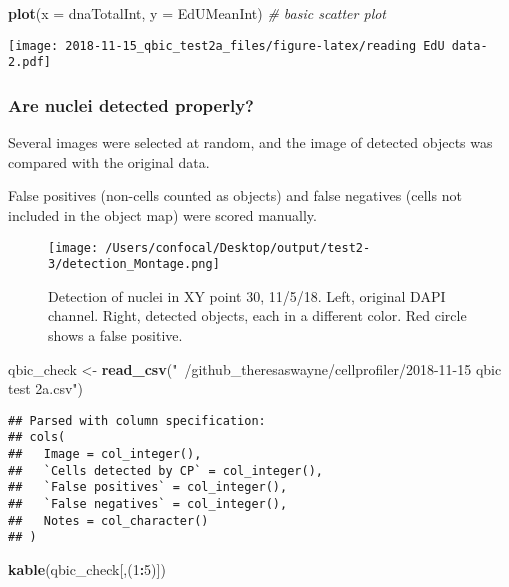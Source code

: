 \documentclass[]{article}
\newenvironment{Shaded}{\begin{snugshade}}{\end{snugshade}}
\newcommand{\KeywordTok}[1]{\textcolor[rgb]{0.13,0.29,0.53}{\textbf{#1}}}
\newcommand{\DataTypeTok}[1]{\textcolor[rgb]{0.13,0.29,0.53}{#1}}
\newcommand{\DecValTok}[1]{\textcolor[rgb]{0.00,0.00,0.81}{#1}}
\newcommand{\StringTok}[1]{\textcolor[rgb]{0.31,0.60,0.02}{#1}}
\newcommand{\CommentTok}[1]{\textcolor[rgb]{0.56,0.35,0.01}{\textit{#1}}}
\newcommand{\OperatorTok}[1]{\textcolor[rgb]{0.81,0.36,0.00}{\textbf{#1}}}
\newcommand{\NormalTok}[1]{#1}
\begin{document}
\begin{Shaded}
\begin{Highlighting}[]
\KeywordTok{plot}\NormalTok{(}\DataTypeTok{x =}\NormalTok{ dnaTotalInt, }\DataTypeTok{y =}\NormalTok{ EdUMeanInt) }\CommentTok{# basic scatter plot}
\end{Highlighting}
\end{Shaded}

\texttt{[image: 2018-11-15\_qbic\_test2a\_files/figure-latex/reading EdU data-2.pdf]}

\subsubsection{Are nuclei detected
properly?}\label{are-nuclei-detected-properly}

Several images were selected at random, and the image of detected
objects was compared with the original data.

False positives (non-cells counted as objects) and false negatives
(cells not included in the object map) were scored manually.

\begin{figure}
\centering
\texttt{[image: /Users/confocal/Desktop/output/test2-3/detection\_Montage.png]}
\caption{Detection of nuclei in XY point 30, 11/5/18. Left, original
DAPI channel. Right, detected objects, each in a different color. Red
circle shows a false positive.}
\end{figure}

\begin{Shaded}
\begin{Highlighting}[]
\NormalTok{qbic_check <-}\StringTok{ }\KeywordTok{read_csv}\NormalTok{(}\StringTok{"~/github_theresaswayne/cellprofiler/2018-11-15 qbic test 2a.csv"}\NormalTok{)}
\end{Highlighting}
\end{Shaded}

\begin{verbatim}
## Parsed with column specification:
## cols(
##   Image = col_integer(),
##   `Cells detected by CP` = col_integer(),
##   `False positives` = col_integer(),
##   `False negatives` = col_integer(),
##   Notes = col_character()
## )
\end{verbatim}

\begin{Shaded}
\begin{Highlighting}[]
\KeywordTok{kable}\NormalTok{(qbic_check[,(}\DecValTok{1}\OperatorTok{:}\DecValTok{5}\NormalTok{)])}
\end{Highlighting}
\end{Shaded}
\end{document}
